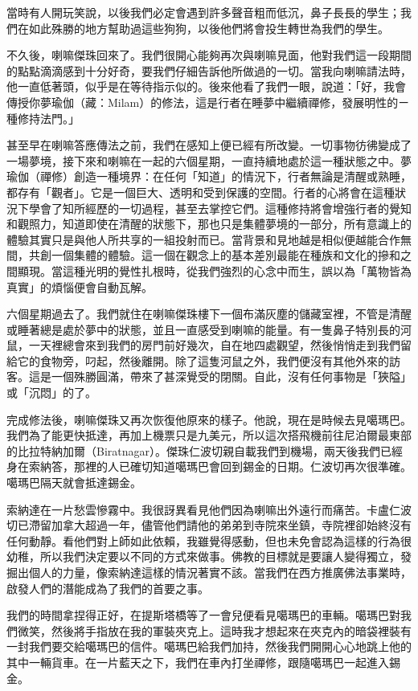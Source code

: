 當時有人開玩笑說，以後我們必定會遇到許多聲音粗而低沉，鼻子長長的學生；我們在如此殊勝的地方幫助過這些狗狗，以後他們將會投生轉世為我們的學生。

不久後，喇嘛傑珠回來了。我們很開心能夠再次與喇嘛見面，他對我們這一段期間的點點滴滴感到十分好奇，要我們仔細告訴他所做過的一切。當我向喇嘛請法時，他一直低著頭，似乎是在等待指示似的。後來他看了我們一眼，說道：「好，我會傳授你夢瑜伽（藏：Milam）的修法，這是行者在睡夢中繼續禪修，發展明性的ㄧ種修持法門。」

甚至早在喇嘛答應傳法之前，我們在感知上便已經有所改變。一切事物彷彿變成了一場夢境，接下來和喇嘛在一起的六個星期，一直持續地處於這一種狀態之中。夢瑜伽（禪修）創造一種境界：在任何「知道」的情況下，行者無論是清醒或熟睡，都存有「觀者」。它是一個巨大、透明和受到保護的空間。行者的心將會在這種狀況下學會了知所經歷的一切過程，甚至去掌控它們。這種修持將會增強行者的覺知和觀照力，知道即使在清醒的狀態下，那也只是集體夢境的一部分，所有意識上的體驗其實只是與他人所共享的一組投射而已。當背景和見地越是相似便越能合作無間，共創一個集體的體驗。這一個在觀念上的基本差別最能在種族和文化的摻和之間顯現。當這種光明的覺性扎根時，從我們強烈的心念中而生，誤以為「萬物皆為真實」的煩惱便會自動瓦解。

六個星期過去了。我們就住在喇嘛傑珠樓下一個布滿灰塵的儲藏室裡，不管是清醒或睡著總是處於夢中的狀態，並且一直感受到喇嘛的能量。有一隻鼻子特別長的河鼠，一天裡總會來到我們的房門前好幾次，自在地四處觀望，然後悄悄走到我們留給它的食物旁，叼起，然後離開。除了這隻河鼠之外，我們便沒有其他外來的訪客。這是一個殊勝圓滿，帶來了甚深覺受的閉關。自此，沒有任何事物是「狹隘」或「沉悶」的了。

完成修法後，喇嘛傑珠又再次恢復他原來的樣子。他說，現在是時候去見噶瑪巴。我們為了能更快抵達，再加上機票只是九美元，所以這次搭飛機前往尼泊爾最東部的比拉特納加爾（Biratnagar）。傑珠仁波切親自載我們到機場，兩天後我們已經身在索納答，那裡的人已確切知道噶瑪巴會回到錫金的日期。仁波切再次很準確。噶瑪巴隔天就會抵達錫金。

索納達在一片愁雲慘霧中。我很訝異看見他們因為喇嘛出外遠行而痛苦。卡盧仁波切已滯留加拿大超過一年，儘管他們請他的弟弟到寺院來坐鎮，寺院裡卻始終沒有任何動靜。看他們對上師如此依賴，我雖覺得感動，但也未免會認為這樣的行為很幼稚，所以我們決定要以不同的方式來做事。佛教的目標就是要讓人變得獨立，發掘出個人的力量，像索納達這樣的情況著實不該。當我們在西方推廣佛法事業時，啟發人們的潛能成為了我們的首要之事。

我們的時間拿捏得正好，在提斯塔橋等了一會兒便看見噶瑪巴的車輛。噶瑪巴對我們微笑，然後將手指放在我的軍裝夾克上。這時我才想起來在夾克內的暗袋裡裝有一封我們要交給噶瑪巴的信件。噶瑪巴給我們加持，然後我們開開心心地跳上他的其中一輛貨車。在一片藍天之下，我們在車內打坐禪修，跟隨噶瑪巴一起進入錫金。

